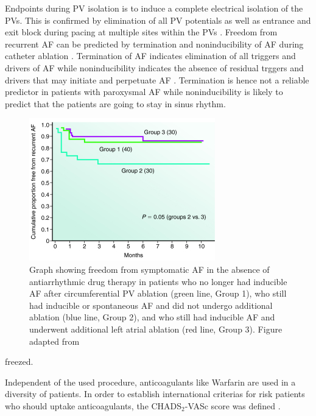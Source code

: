 \documentclass[type=dr, dr=rernat, accentcolor=tud7b,colorbacktitle, bigchapter, openright, twoside, 12pt ]{tudthesis}
\begin{document}
Endpoints during PV isolation is to induce a complete electrical isolation of the PVs. This is confirmed by elimination of all PV potentials 
as well as entrance and exit block during pacing at multiple sites within the PVs \cite{CE09}. Freedom from recurrent AF can be predicted by 
termination and noninducibility of AF during catheter ablation \cite{Ora02} \cite{Ora06} \cite{Hai05} \cite{Hai04} \cite{Ora04}. Termination 
of AF indicates elimination of all triggers and drivers of AF while noninducibility indicates the absence of residual trggers and drivers 
that may initiate and perpetuate AF \cite{CE09}. Termination is hence not a reliable predictor in patients with paroxysmal AF while 
noninducibility is likely to predict that the patients are going to stay in sinus rhythm. 

\begin{figure}[H]
\begin{center}
\includegraphics[scale=1.0]{ablation_success_cut.png}
\caption{Graph showing freedom from symptomatic AF in the absence of antiarrhythmic drug therapy in patients who no longer had inducible AF 
after circumferential PV ablation (green line, Group 1), who still had inducible or spontaneous AF and did not undergo additional ablation 
(blue line, Group 2), and who still had inducible AF and underwent additional left atrial ablation (red line, Group 3). Figure adapted 
from \cite{Ora04}}
\end{center}
\end{figure}


freezed.\newline



Independent of the used procedure, anticoagulants like Warfarin are used in a diversity of patients. In order to establish international 
criterias for risk patients who should uptake anticoagulants, the CHADS$_{2}$-VASc score was defined \cite{ESC12}.
\end{document}
